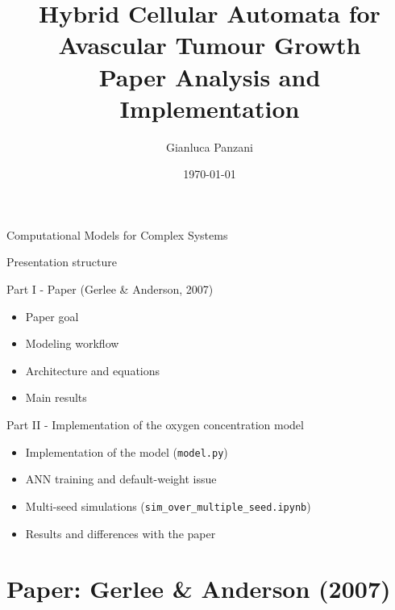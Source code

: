 \documentclass[10pt,aspectratio=169]{beamer}
\title[Hybrid CA: Paper and Implementation]{Hybrid Cellular Automata for Avascular Tumour Growth\\Paper Analysis and Implementation}
\author{Gianluca Panzani}
\institute{University of Pisa - Computer Science AI}
\date{\today}
\begin{document}
\begin{frame}
  \titlepage
  \vspace{-0.4em}
  \begin{center}
    {\large Computational Models for Complex Systems}
  \end{center}
\end{frame}

\begin{frame}[c]{Presentation structure}
\normalsize
\begin{block}{Part I - Paper (Gerlee \& Anderson, 2007)}
\begin{itemize}
  \item Paper goal
  \item Modeling workflow
  \item Architecture and equations
  \item Main results
\end{itemize}
\end{block}

\begin{block}{Part II - Implementation of the oxygen concentration model}
\begin{itemize}
  \item Implementation of the model (\texttt{model.py})
  \item ANN training and default-weight issue
  \item Multi-seed simulations (\texttt{sim\_over\_multiple\_seed.ipynb})
  \item Results and differences with the paper
\end{itemize}
\end{block}
\end{frame}


\section{Paper: Gerlee \& Anderson (2007)}
\end{document}
